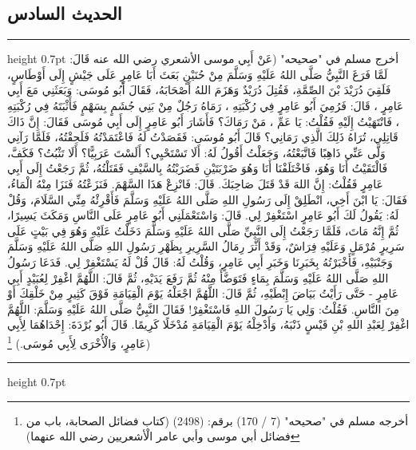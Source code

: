 \documentclass[12pt,openany]{book}
\newenvironment{hadithblock}
  {\par\medskip\noindent\begin{minipage}{\linewidth}\hrule height 0.7pt \vspace{0.6em}\small}
  {\vspace{0.4em}\hrule height 0.7pt\end{minipage}\par\medskip}
\begin{document}
\subsection*{الحديث السادس}
\begin{hadithblock}
أخرج مسلم في "صحيحه" (عَنْ أَبِي موسى الأشعري رضي الله عنه قَالَ: لَمَّا فَرَغَ النَّبِيُّ صَلَّى اللهُ عَلَيْهِ وَسَلَّمَ مِنْ حُنَيْنٍ بَعَثَ أَبَا عَامِرٍ عَلَى جَيْشٍ إِلَى أَوْطَاسٍ، فَلَقِيَ دُرَيْدَ بْنَ الصِّمَّةِ، فَقُتِلَ دُرَيْدٌ وَهَزَمَ اللهُ أَصْحَابَهُ، فَقَالَ أَبُو مُوسَى: وَبَعَثَنِي مَعَ أَبِي عَامِرٍ ، قَالَ: فَرُمِيَ أَبُو عَامِرٍ فِي رُكْبَتِهِ ، رَمَاهُ رَجُلٌ مِنْ بَنِي جُشَمٍ بِسَهْمٍ فَأَثْبَتَهُ فِي رُكْبَتِهِ ، فَانْتَهَيْتُ إِلَيْهِ فَقُلْتُ: يَا عَمِّ ، مَنْ رَمَاكَ؟ فَأَشَارَ أَبُو عَامِرٍ إِلَى أَبِي مُوسَى فَقَالَ: إِنَّ ذَاكَ قَاتِلِي، تُرَاهُ ذَلِكَ الَّذِي رَمَانِي؟ قَالَ أَبُو مُوسَى: فَقَصَدْتُ لَهُ فَاعْتَمَدْتُهُ فَلَحِقْتُهُ، فَلَمَّا رَآنِي وَلَّى عَنِّي ذَاهِبًا فَاتَّبَعْتُهُ، وَجَعَلْتُ أَقُولُ لَهُ: أَلَا تَسْتَحْيِي؟ أَلَسْتَ عَرَبِيًّا؟ أَلَا تَثْبُتُ؟ فَكَفَّ، فَالْتَقَيْتُ أَنَا وَهُوَ، فَاخْتَلَفْنَا أَنَا وَهُوَ ضَرْبَتَيْنِ فَضَرَبْتُهُ بِالسَّيْفِ فَقَتَلْتُهُ، ثُمَّ رَجَعْتُ إِلَى أَبِي عَامِرٍ فَقُلْتُ: إِنَّ اللهَ قَدْ قَتَلَ صَاحِبَكَ. قَالَ: فَانْزِعْ هَذَا السَّهْمَ. فَنَزَعْتُهُ فَنَزَا مِنْهُ الْمَاءُ، فَقَالَ: يَا ابْنَ أَخِي، انْطَلِقْ إِلَى رَسُولِ اللهِ صَلَّى اللهُ عَلَيْهِ وَسَلَّمَ فَأَقْرِئْهُ مِنِّي السَّلَامَ، وَقُلْ لَهُ: يَقُولُ لَكَ أَبُو عَامِرٍ اسْتَغْفِرْ لِي. قَالَ: وَاسْتَعْمَلَنِي أَبُو عَامِرٍ عَلَى النَّاسِ وَمَكَثَ يَسِيرًا، ثُمَّ إِنَّهُ مَاتَ، فَلَمَّا رَجَعْتُ إِلَى النَّبِيِّ صَلَّى اللهُ عَلَيْهِ وَسَلَّمَ دَخَلْتُ عَلَيْهِ وَهُوَ فِي بَيْتٍ عَلَى سَرِيرٍ مُرْمَلٍ وَعَلَيْهِ فِرَاشٌ، وَقَدْ أَثَّرَ رِمَالُ السَّرِيرِ بِظَهْرِ رَسُولِ اللهِ صَلَّى اللهُ عَلَيْهِ وَسَلَّمَ وَجَنْبَيْهِ، فَأَخْبَرْتُهُ بِخَبَرِنَا وَخَبَرِ أَبِي عَامِرٍ، وَقُلْتُ لَهُ: قَالَ قُلْ لَهُ يَسْتَغْفِرْ لِي. فَدَعَا رَسُولُ اللهِ صَلَّى اللهُ عَلَيْهِ وَسَلَّمَ بِمَاءٍ فَتَوَضَّأَ مِنْهُ ثُمَّ رَفَعَ يَدَيْهِ، ثُمَّ قَالَ: اللَّهُمَّ اغْفِرْ لِعُبَيْدٍ أَبِي عَامِرٍ - حَتَّى رَأَيْتُ بَيَاضَ إِبْطَيْهِ، ثُمَّ قَالَ: اللَّهُمَّ اجْعَلْهُ يَوْمَ الْقِيَامَةِ فَوْقَ كَثِيرٍ مِنْ خَلْقِكَ أَوْ مِنَ النَّاسِ. فَقُلْتُ: وَلِي يَا رَسُولَ اللهِ فَاسْتَغْفِرْ! فَقَالَ النَّبِيُّ صَلَّى اللهُ عَلَيْهِ وَسَلَّمَ: اللَّهُمَّ اغْفِرْ لِعَبْدِ اللهِ بْنِ قَيْسٍ ذَنْبَهُ، وَأَدْخِلْهُ يَوْمَ الْقِيَامَةِ مُدْخَلًا كَرِيمًا. قَالَ أَبُو بُرْدَةَ: إِحْدَاهُمَا لِأَبِي عَامِرٍ، وَالْأُخْرَى لِأَبِي مُوسَى.) \footnote{أخرجه مسلم في "صحيحه" (7 / 170) برقم: (2498) (كتاب فضائل الصحابة، باب من فضائل أبي موسى وأبي عامر الْأشعريين رضي الله عنهما)})
\end{hadithblock}
\end{document}

